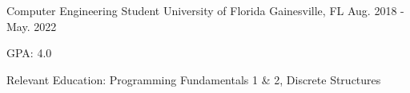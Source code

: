\begin{cventries}
  \cventry
	{Computer Engineering Student}
	{University of Florida}
	{Gainesville, FL}
	{Aug. 2018 - May. 2022}
	{
		\begin{cvitems}
			\item {GPA: 4.0}
			\item {Relevant Education: Programming Fundamentals 1 \& 2, Discrete Structures}
		\end{cvitems}
	}
\end{cventries}
